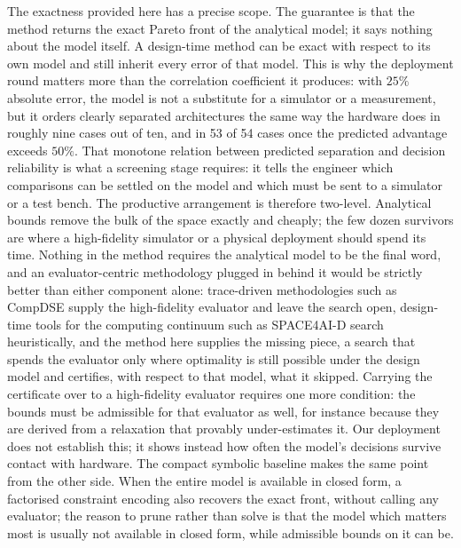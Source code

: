 \documentclass[pdflatex,sn-nature,lineno]{sn-jnl}
\newcommand{\ReliabilityFifty}{53 of 54}
\begin{document}
The exactness provided here has a precise scope. The guarantee is that the method returns the exact Pareto front of the
analytical model; it says nothing about the model itself. A design-time method can be
exact with respect to its own model and still inherit every error of that model. This is
why the deployment round matters more than the correlation coefficient it produces: with
$25\%$ absolute error, the model is not a substitute for a simulator or a measurement,
but it orders clearly separated architectures the same way the hardware does in roughly
nine cases out of ten, and in \ReliabilityFifty{} cases once the predicted advantage exceeds
$50\%$. That monotone relation between predicted separation and decision reliability is
what a screening stage requires: it tells the engineer which comparisons can be settled on
the model and which must be sent to a simulator or a test bench. The productive
arrangement is therefore two-level. Analytical bounds remove the bulk of the space
exactly and cheaply; the few dozen survivors are where a high-fidelity simulator or a
physical deployment should spend its time. Nothing in the method requires the analytical
model to be the final word, and an evaluator-centric methodology plugged in behind it
would be strictly better than either component alone: trace-driven methodologies such as
CompDSE\cite{saadatmand2025compdse} supply the high-fidelity evaluator and leave the search
open, design-time tools for the computing continuum such as
SPACE4AI-D\cite{sedghani2024space4aid} search heuristically, and the method here supplies
the missing piece, a search that spends the evaluator only where optimality is still
possible under the design model and certifies, with respect to that model, what it
skipped. Carrying the certificate over to a high-fidelity evaluator requires one more
condition: the bounds must be admissible for that evaluator as well, for instance
because they are derived from a relaxation that provably under-estimates it. Our
deployment does not establish this; it shows instead how often the model's decisions
survive contact with hardware. The compact symbolic baseline makes the same point
from the other side. When the entire model is available in closed form, a factorised
constraint encoding also recovers the exact front, without calling any evaluator; the
reason to prune rather than solve is that the model which matters most is usually not
available in closed form, while admissible bounds on it can be.
\end{document}
